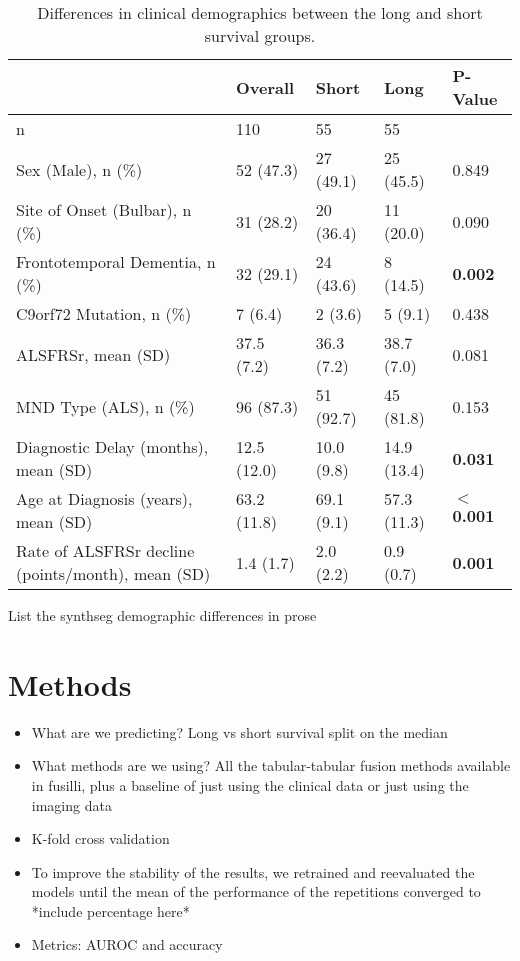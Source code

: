 \begin{table}
    \centering
    \caption{Differences in clinical demographics between the long and short survival groups.}
    \begin{tabular}{|p{5cm}|llll|}
    \hline
                                                        & \textbf{Overall}     & \textbf{Short}        & \textbf{Long}         & \textbf{P-Value}   \\
    \hline
     n                                                  & 110         & 55         & 55          &           \\ \hline
     Sex (Male), n (\%)                                     & 52 (47.3)   & 27 (49.1)  & 25 (45.5)   & 0.849     \\ \hline
     Site of Onset (Bulbar), n (\%)                          & 31 (28.2)   & 20 (36.4)  & 11 (20.0)  & 0.090     \\\hline
     Frontotemporal Dementia, n (\%)                       & 32 (29.1)   & 24 (43.6)  & 8 (14.5)   & \textbf{0.002}     \\\hline
     C9orf72 Mutation, n (\%)                               & 7 (6.4)     & 2 (3.6)    & 5 (9.1)   & 0.438     \\\hline
     ALSFRSr, mean (SD)                                  & 37.5 (7.2)  & 36.3 (7.2) & 38.7 (7.0)  & 0.081     \\\hline
     MND Type (ALS), n (\%)                                & 96 (87.3)   & 51 (92.7)  & 45 (81.8)   & 0.153     \\\hline
     Diagnostic Delay (months), mean (SD)                 & 12.5 (12.0) & 10.0 (9.8) & 14.9 (13.4) & \textbf{0.031}     \\\hline
     Age at Diagnosis (years), mean (SD)                   & 63.2 (11.8) & 69.1 (9.1) & 57.3 (11.3) & \textbf{\ensuremath{<}0.001 }   \\\hline
     Rate of ALSFRSr decline (points/month), mean (SD)       & 1.4 (1.7)   & 2.0 (2.2)  & 0.9 (0.7)   & \textbf{0.001}     \\\hline
    \end{tabular}
\end{table}

List the synthseg demographic differences in prose

\section{Methods}
\begin{itemize}
    \item What are we predicting? Long vs short survival split on the median
    \item What methods are we using? All the tabular-tabular fusion methods available in fusilli, plus a baseline of just using the clinical data or just using the imaging data
    \item K-fold cross validation
    \item To improve the stability of the results, we retrained and reevaluated the models until the mean of the performance of the repetitions converged to *include percentage here*
    \item Metrics: AUROC and accuracy
\end{itemize}

